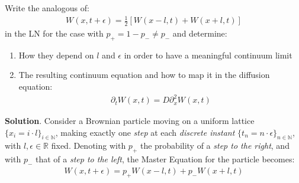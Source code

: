\documentclass[../template.tex]{subfiles}
\begin{document}
\begin{exo}
    Write the analogous of:
    \begin{align}
        W(x,t+\epsilon) = \frac{1}{2}[W(x-l, t) + W(x+l,t)] 
        \label{eqn:ME}
    \end{align}
    in the LN for the case with $p_+ = 1-p_- \neq p_-$ and determine:
    \begin{enumerate}
        \item How they depend on $l$ and $\epsilon$ in order to have a meaningful continuum limit
        \item The resulting continuum equation and how to map it in the diffusion equation:
        \begin{align*}
            \partial_t W(x,t) = D \partial_x^2 W(x,t)
        \end{align*}  
    \end{enumerate} 

    \medskip

    \textbf{Solution}. Consider a Brownian particle moving on a uniform lattice $\{x_i = i \cdot l\}_{i \in \mathbb{N}}$, making exactly one \textit{step} at each \textit{discrete instant} $\{t_n = n \cdot \epsilon\}_{n \in \mathbb{N}}$, with $l, \epsilon \in \mathbb{R}$ fixed. Denoting with $p_+$ the probability of a \textit{step to the right}, and with $p_-$ that of a \textit{step to the left}, the Master Equation for the particle becomes:
    \begin{align} \label{eqn:ME2}
        W(x,t+\epsilon) = p_+ W(x-l,t) + p_- W(x+l,t)
    \end{align}  
    

\end{exo}
\end{document}
